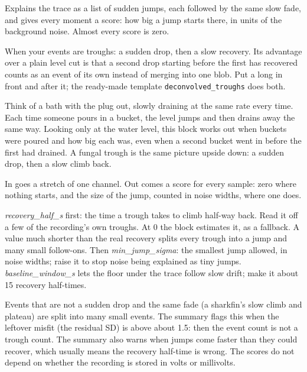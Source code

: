 Explains the trace as a list of sudden jumps, each followed by the same slow fade, and gives
every moment a score: how big a jump starts there, in units of the background noise. Almost
every score is zero.

When your events are troughs: a sudden drop, then a slow recovery. Its advantage over a
plain level cut is that a second drop starting before the first has recovered counts as an
event of its own instead of merging into one blob. Put a long 
in front and  after it; the ready-made template
\texttt{deconvolved\_troughs} does both.

\begin{plainterms}
Think of a bath with the plug out, slowly draining at the same rate every time. Each time
someone pours in a bucket, the level jumps and then drains away the same way. Looking only at
the water level, this block works out when buckets were poured and how big each was, even when
a second bucket went in before the first had drained. A fungal trough is the same picture
upside down: a sudden drop, then a slow climb back.
\end{plainterms}

In goes a stretch of one channel. Out comes a score for every sample: zero where nothing
starts, and the size of the jump, counted in noise widths, where one does.

\emph{recovery\_half\_s} first: the time a trough takes to climb half-way back. Read it off a
few of the recording's own troughs. At 0 the block estimates it, as a fallback. A value much
shorter than the real recovery splits every trough into a jump and many small follow-ons.
Then \emph{min\_jump\_sigma}: the smallest jump allowed, in noise widths; raise it to stop
noise being explained as tiny jumps. \emph{baseline\_window\_s} lets the floor under the trace
follow slow drift; make it about 15 recovery half-times.

Events that are not a sudden drop and the same fade (a sharkfin's slow climb and plateau) are
split into many small events. The summary flags this when the leftover misfit (the residual
SD) is above about 1.5: then the event count is not a trough count. The summary also warns
when jumps come faster than they could recover, which usually means the recovery half-time is
wrong. The scores do not depend on whether the recording is stored in volts or millivolts.

